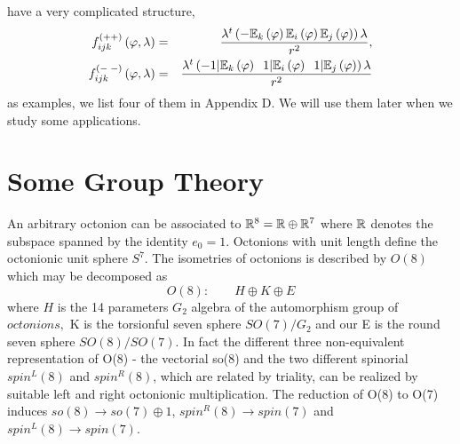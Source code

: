 \documentclass[a4paper,12pt]{book}
\begin{document}
have a very complicated structure, 
\begin{eqnarray}
f_{ijk}^{\left( ++\right) }\left( \varphi ,\lambda \right) &=&\frac{\lambda
^{t}\left( -\Bbb{E}_{k}\left( \varphi \right) \Bbb{E}_{i}\left( \varphi
\right) \Bbb{E}_{j}\left( \varphi \right) \right) \lambda }{r^{2}}, \\
f_{ijk}^{\left( -\;-\right) }\left( \varphi ,\lambda \right) &=&\frac{%
\lambda ^{t}\left( -1|\Bbb{E}_{k}\left( \varphi \right) \;\;1|\Bbb{E}%
_{i}\left( \varphi \right) \;\;1|\Bbb{E}_{j}\left( \varphi \right) \right)
\lambda }{r^{2}}
\end{eqnarray}
as examples, we list four of them in Appendix D. We will use them later when
we study some applications.

\section{Some Group Theory}

An arbitrary octonion can be associated to $\Bbb{R}^{8}=\Bbb{R}\oplus \Bbb{R}%
^{7}$ \cite{luk} where $\Bbb{R}$ denotes the subspace spanned by the
identity $e_{0}=1$. Octonions with unit length define the octonionic unit
sphere $S^{7}$. The isometries of octonions is described by $O(8)$ which may
be decomposed as 
\begin{equation}
O(8):\quad \quad H\oplus K\oplus E
\end{equation}
where $H$ is the 14 parameters $G_{2}$ algebra of the automorphism group of $%
octonions,$ K is the torsionful seven sphere $SO(7)/G_{2}$ and our E is the
round seven sphere $SO(8)/SO(7)$. In fact the different three non-equivalent
representation of O(8) - the vectorial so(8) and the two different spinorial 
$spin^{L}(8)$ and $spin^{R}(8)$, which are related by triality, can be
realized by suitable left and right octonionic multiplication. The reduction
of O(8) to O(7) induces $so(8)\longrightarrow so(7)\oplus 1$, $%
spin^{R}(8)\longrightarrow spin(7)$ and $spin^{L}(8)\longrightarrow spin(7)$.
\end{document}
